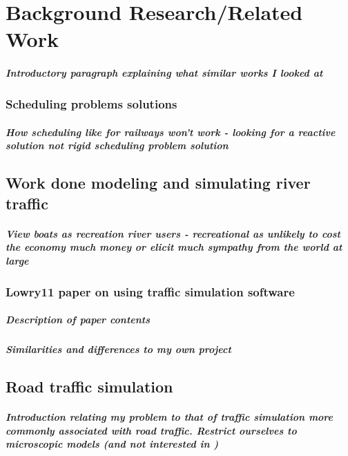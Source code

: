 \chapter{Background Research/Related Work}
  \paragraph{Introductory paragraph explaining what similar works I looked at}
  

  \subsection{Scheduling problems solutions}
    \paragraph{How scheduling like for railways won't work - looking for a reactive solution not rigid scheduling problem solution}

  \section{Work done modeling and simulating river traffic}
    \paragraph{View boats as recreation river users - recreational as unlikely to cost the economy much money or elicit much sympathy from the world at large}

    \subsection{Lowry11 paper on using traffic simulation software}
      \paragraph{Description of paper contents}
      \paragraph{Similarities and differences to my own project}
      
  \section{Road traffic simulation}
      \paragraph{Introduction relating my problem to that of traffic simulation more commonly associated with road traffic. Restrict ourselves to microscopic models (and not interested in )}
